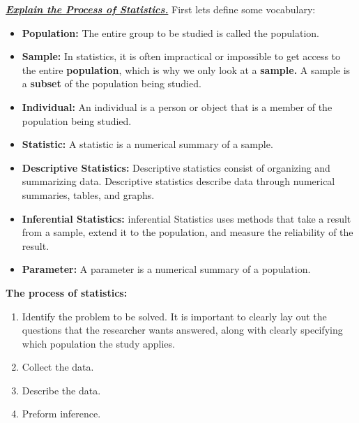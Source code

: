 \documentclass{report}
\begin{document}
        \bigbreak \noindent \bigbreak \noindent 
        \textbf{\textit{\underline{Explain the Process of Statistics.}}}
        \bigbreak \noindent 
        First lets define some vocabulary:
        \begin{itemize}
            \item \textbf{Population:} The entire group to be studied is called the population.
            \item \textbf{Sample:} In statistics, it is often impractical or impossible to get access to the entire \textbf{population}, which is why we only look at a \textbf{sample.} A sample is a \textbf{subset} of the population being studied.
            \item \textbf{Individual:} An individual is a person or object that is a member of the population being studied.
            \item \textbf{Statistic:} A statistic is a numerical summary of a sample.
            \item \textbf{Descriptive Statistics:} Descriptive statistics consist of organizing and summarizing data. Descriptive statistics describe data through numerical summaries, tables, and graphs.
            \item \textbf{Inferential Statistics:} inferential Statistics uses methods that take a result from a sample, extend it to the population, and measure the reliability of the result.
            \item \textbf{Parameter:} A parameter is a numerical summary of a population.
        \end{itemize}

        \bigbreak \noindent 
        \textbf{The process of statistics:}
        \begin{enumerate}
            \item Identify the problem to be solved. It is important to clearly lay out the questions that the researcher wants answered, along with clearly specifying which population the study applies.
            \item Collect the data.
            \item Describe the data.
            \item Preform inference.
        \end{enumerate}
\end{document}

